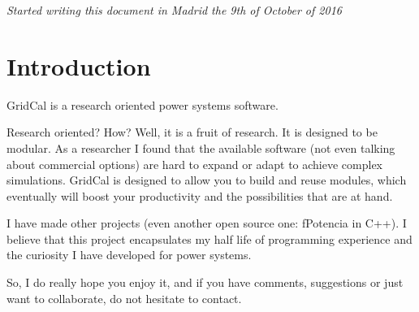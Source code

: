 \documentclass[11pt,fleqn]{book} %
\begin{document}
\noindent \textit{Started writing this document in Madrid the 9th of October of 2016} %



\pagestyle{empty} %

\renewcommand\contentsname{Table of content}
\tableofcontents%


\pagestyle{fancy} %



\chapter{Introduction}

GridCal is a research oriented power systems software.  \newline

Research oriented? How? Well, it is a fruit of research. It is designed to be modular. As a researcher I found that the available software (not even talking about commercial options) are hard to expand or adapt to achieve complex simulations. GridCal is designed to allow you to build and reuse modules, which eventually will boost your productivity and the possibilities that are at hand. \newline

I have made other projects (even another open source one: fPotencia in C++). I believe that this project encapsulates my half life of programming experience and the curiosity I have developed for power systems. \newline

So, I do really hope you enjoy it, and if you have comments, suggestions or just want to collaborate, do not hesitate to contact.\newline
\end{document}
